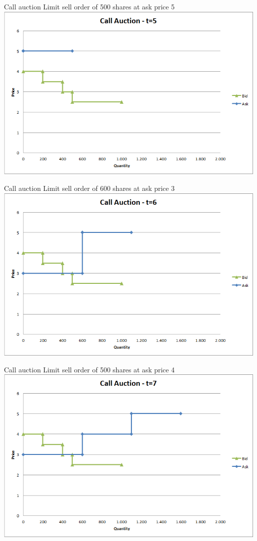 \begin{frame}{Call auction}
	Limit sell order of 500 shares at ask price 5
	\quad
	\center
	\includegraphics[width=.75\linewidth]{pics/Call_t5}
\end{frame}


\begin{frame}{Call auction}
	Limit sell order of 600 shares at ask price 3
	\quad
	\center
	\includegraphics[width=.75\linewidth]{pics/Call_t6}
\end{frame}


\begin{frame}{Call auction}
	Limit sell order of 500 shares at ask price 4
	\quad
	\center
	\includegraphics[width=.75\linewidth]{pics/Call_t7}
\end{frame}


